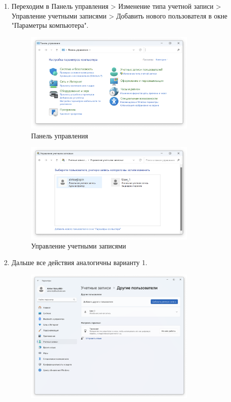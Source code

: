 \documentclass[a4paper, 14pt]{report}
\begin{document}
\begin{enumerate}
    \item {Переходим в Панель управления > Изменение типа учетной записи > Управление учетными записями > Добавить нового пользователя в окне "Параметры компьютера".
          \begin{figure}[H]
              \centering
              \includegraphics[width=0.8\textwidth]{../images/control_panel.png}
              \caption{Панель управления}
          \end{figure}
          \begin{figure}[H]
              \centering
              \includegraphics[width=0.8\textwidth]{../images/account_management.png}
              \caption{Управление учетными записями}
          \end{figure}
          }
    \item {Дальше все действия аналогичны варианту 1.
          \begin{figure}[H]
              \centering
              \includegraphics[width=0.8\textwidth]{../images/user_created.png}

\end{figure}}
\end{enumerate}
\end{document}
